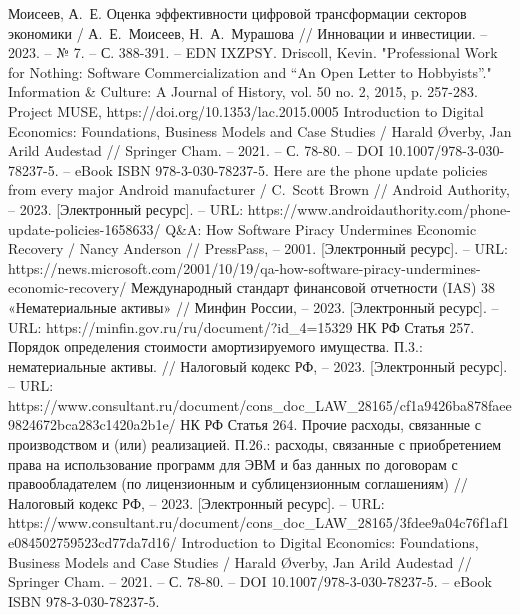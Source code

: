 \documentclass{article}
\begin{document}
\begin{thebibliography}{2}
 Моисеев, А.~Е. Оценка эффективности цифровой трансформации секторов экономики / А.~Е.~Моисеев, Н.~А.~Мурашова // Инновации и инвестиции. – 2023. – № 7. – С. 388-391. – EDN IXZPSY.
 Driscoll, Kevin. "Professional Work for Nothing: Software Commercialization and “An Open Letter to Hobbyists”." Information \& Culture: A Journal of History, vol. 50 no. 2, 2015, p. 257-283. Project MUSE, https://doi.org/10.1353/lac.2015.0005
Introduction to Digital Economics: Foundations, Business Models and Case Studies / Harald Øverby, Jan Arild Audestad // Springer Cham. – 2021. – С. 78-80. – DOI 10.1007/978-3-030-78237-5. – eBook ISBN 978-3-030-78237-5.
 Here are the phone update policies from every major Android manufacturer / C.~Scott Brown // Android Authority, – 2023. [Электронный ресурс]. – URL: https://www.androidauthority.com/phone-update-policies-1658633/
 Q\&A: How Software Piracy Undermines Economic Recovery / Nancy Anderson // PressPass, – 2001. [Электронный ресурс]. – URL: https://news.microsoft.com/2001/10/19/qa-how-software-piracy-undermines-economic-recovery/
 Международный стандарт финансовой отчетности (IAS) 38 «Нематериальные активы» // Минфин России, – 2023. [Электронный ресурс]. – URL: https://minfin.gov.ru/ru/document/?id\_4=15329
 НК РФ Статья 257. Порядок определения стоимости амортизируемого имущества. П.3.: нематериальные активы. // Налоговый кодекс РФ, – 2023. [Электронный ресурс]. – URL: https://www.consultant.ru/document/cons\_doc\_LAW\_28165/cf1a9426ba878faee9824672bca283c1420a2b1e/
 НК РФ Статья 264. Прочие расходы, связанные с производством и (или) реализацией. П.26.: расходы, связанные с приобретением права на использование программ для ЭВМ и баз данных по договорам с правообладателем (по лицензионным и сублицензионным соглашениям) // Налоговый кодекс РФ, – 2023. [Электронный ресурс]. – URL: https://www.consultant.ru/document/cons\_doc\_LAW\_28165/3fdee9a04c76f1af1e084502759523cd77da7d16/
 Introduction to Digital Economics: Foundations, Business Models and Case Studies / Harald Øverby, Jan Arild Audestad // Springer Cham. – 2021. – С. 78-80. – DOI 10.1007/978-3-030-78237-5. – eBook ISBN 978-3-030-78237-5.

\end{thebibliography}
\end{document}
